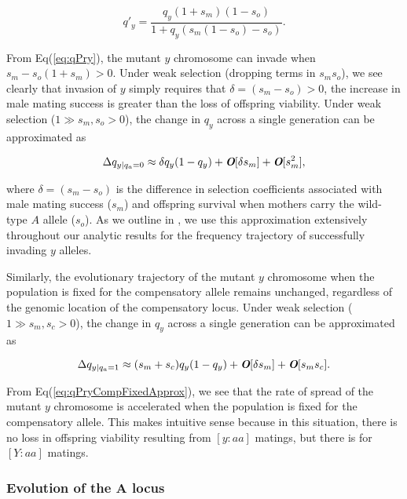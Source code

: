 \documentclass{article}
\def\mathbi#1{\textbf{\em #1}}
\begin{document}
\begin{equation} \label{eq:qPry}
	q'_{y} = \frac{q_y (1 + s_m)(1 - s_o)}{1 + q_y (s_m (1 - s_o) - s_o)}.
\end{equation}

\noindent From Eq(\ref{eq:qPry}), the mutant $y$ chromosome can invade when $s_m - s_o(1 + s_m) > 0$. Under weak selection (dropping terms in $s_m s_o$), we see clearly that invasion of $y$ simply requires that $\delta = (s_m - s_o) > 0$, the increase in male mating success is greater than the loss of offspring viability. Under weak selection ($1 \gg s_m,s_o > 0$), the change in $q_y$ across a single generation can be approximated as

\begin{equation} \label{eq:qPryApprox}
	\Delta q_{y | q_a = 0}\approx \delta q_y (1 - q_y) + \mathbi{O}[\delta s_m] + \mathbi{O}[s_m^2],
\end{equation}

\noindent where $\delta = (s_m - s_o)$ is the difference in selection coefficients associated with male mating success ($s_m$) and offspring survival when mothers carry the wild-type $A$ allele ($s_o$). As we outline in , we use this approximation extensively throughout our analytic results for the frequency trajectory of successfully invading $y$ alleles.
\bigskip

Similarly, the evolutionary trajectory of the mutant $y$ chromosome when the population is fixed for the compensatory allele remains unchanged, regardless of the genomic location of the compensatory locus. Under weak selection ($1 \gg s_m,s_c > 0$), the change in $q_y$ across a single generation can be approximated as

\begin{equation} \label{eq:qPryCompFixedApprox}
	\Delta q_{y|q_a = 1}\approx (s_m + s_c) q_y (1 - q_y) + \mathbi{O}[\delta s_m] + \mathbi{O}[s_m s_c].
\end{equation}

\noindent From Eq(\ref{eq:qPryCompFixedApprox}), we see that the rate of spread of the mutant $y$ chromosome is accelerated when the population is fixed for the compensatory allele. This makes intuitive sense because in this situation, there is no loss in offspring viability resulting from $[y:aa]$ matings, but there is for $[Y:aa]$ matings.



\subsubsection{Evolution of the \textbf{A} locus}
\end{document}
